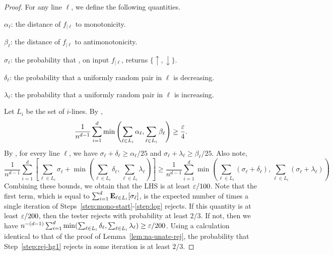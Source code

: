 \begin{proof} For any line $\ell$, we define the following quantities.
\begin{compactitem}
\item $\alpha_\ell$: the distance of $f_{|\ell}$ to monotonicity.
\item $\beta_\ell$: the distance of $f_{|\ell}$ to antimonotonicity.
\item $\sigma_\ell$: the probability that , on input $f_{|\ell}$, returns $\{\uparrow, \downarrow\}$.
\item $\delta_\ell$: the probability that a uniformly random pair in $\ell$ is decreasing.
\item $\lambda_\ell$: the probability that a uniformly random pair in $\ell$ is increasing.
\end{compactitem}

\noindent Let $L_i$ be the set of $i$-lines. By 
,
	$$\frac{1}{n^{d-1}} \sum_{i=1}^d \min\left(\sum_{\ell \in L_i} \alpha_\ell, \sum_{\ell \in L_i} \beta_\ell \right) \geq \frac{\varepsilon}{4}.$$
	By , for every line $\ell$, we have
	$\sigma_\ell + \delta_\ell \geq \alpha_\ell/25$ and $\sigma_\ell + \lambda_\ell \geq \beta_\ell/25$.
	Also note,
	$$
	\frac{1}{n^{d-1}}\sum_{i=1}^d \left[\sum_{\ell \in L_i} \sigma_\ell + \min\left(\sum_{\ell \in L_i} \delta_\ell, \sum_{\ell \in L_i} \lambda_\ell \right)\right] \geq \frac{1}{n^{d-1}}\sum_{i=1}^d  \min\left(\sum_{\ell \in L_i} (\sigma_\ell + \delta_\ell), \sum_{\ell \in L_i} (\sigma_\ell + \lambda_\ell) \right)$$
	Combining these bounds, we obtain that the LHS is at least $\varepsilon/100$.
	Note that the first term,
	which is equal to $\sum_{i=1}^d \hbox{\bf E}_{\ell \in L_i} [\sigma_\ell]$,
	is the expected
	number of times a single iteration of Steps~\ref{step:mono-start}-\ref{step:log}
	rejects. If this quantity is at least $\varepsilon/200$, then
	the tester rejects with probability at least $2/3$. If not,
	then we have $n^{-(d-1)} \sum_{i=1}^d \min(\sum_{\ell \in L_i} \delta_\ell, \sum_{\ell \in L_i} \lambda_\ell) \geq \varepsilon/200$.
	Using a calculation identical to that of the proof of Lemma~\ref{lem:na-unate-rej},
	the probability that Step~\ref{step:rej-hg1} rejects in some iteration is at least
	$2/3$.
\end{proof}


